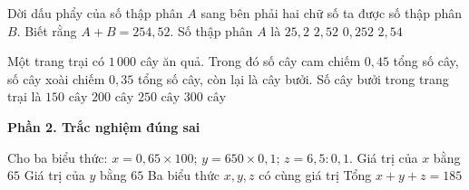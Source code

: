 \begin{ex} %
Dời dấu phẩy của số thập phân $A$ sang bên phải hai chữ số ta được số thập phân $B$. Biết rằng $A + B = 254{,}52$. Số thập phân $A$ là
\choice
{$25{,}2$}
{\True $2{,}52$}
{$0{,}252$}
{$2{,}54$}
\end{ex}

\begin{ex} %
Một trang trại có $1\,000$ cây ăn quả. Trong đó số cây cam chiếm $0{,}45$ tổng số cây, số cây xoài chiếm $0{,}35$ tổng số cây, còn lại là cây bưởi. Số cây bưởi trong trang trại là
\choice
{$150\text{ cây}$}
{\True $200\text{ cây}$}
{$250\text{ cây}$}
{$300\text{ cây}$}
\end{ex}

\textbf{Phần 2. Trắc nghiệm đúng sai}

\begin{ex} %
Cho ba biểu thức: $x = 0{,}65 \times 100$; $y = 650 \times 0{,}1$; $z = 6{,}5 : 0{,}1$.
\choiceTF
{\True Giá trị của $x$ bằng $65$}
{\True Giá trị của $y$ bằng $65$}
{\True Ba biểu thức $x, y, z$ có cùng giá trị}
{Tổng $x + y + z = 185$}
\end{ex}

